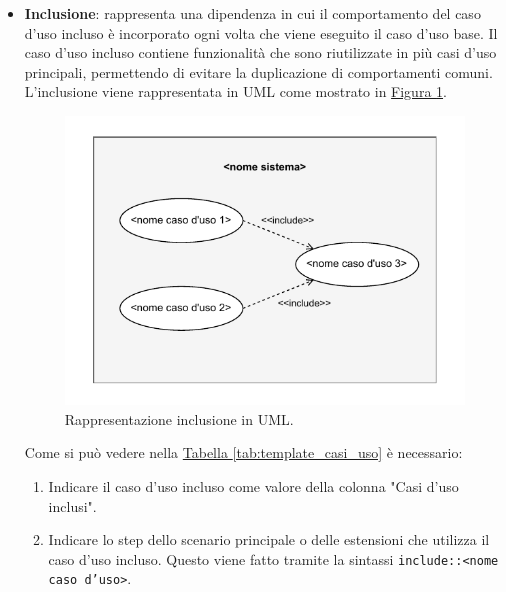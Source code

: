 \begin{itemize}
\begin{itemize}
        \item \textbf{Inclusione}: rappresenta una dipendenza in cui il comportamento del caso d'uso incluso è incorporato ogni volta che viene eseguito il caso d'uso base. Il caso d'uso incluso contiene funzionalità che sono riutilizzate in più casi d'uso principali, permettendo di evitare la duplicazione di comportamenti comuni.
        L'inclusione viene rappresentata in UML come mostrato in \hyperref[fig:inclusione_uml]{Figura \ref{fig:inclusione_uml}}.
        \begin{figure}[!h]
            \centering
            \includegraphics{Sezioni/ProcessiPrimari/Immagini/inclusione_uml.pdf}
            \caption{Rappresentazione inclusione in UML.}
            \label{fig:inclusione_uml}
        \end{figure}
        Come si può vedere nella \hyperref[tab:template_casi_uso]{Tabella \ref{tab:template_casi_uso}} è necessario:
        \begin{enumerate}
            \item Indicare il caso d'uso incluso come valore della colonna "Casi d'uso inclusi".
            \item Indicare lo step dello scenario principale o delle estensioni che utilizza il caso d'uso incluso.
            Questo viene fatto tramite la sintassi \texttt{include::<nome caso d'uso>}.
        \end{enumerate} 


\end{itemize}
\end{itemize}
